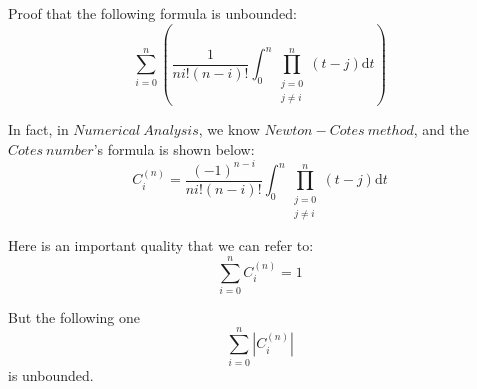 \documentclass{article}
\begin{document}
\begin{CJK*}{UTF8}{gbsn}

Proof that the following formula is unbounded:
\[ \sum\limits_{i = 0}^n \left( \frac{1}{ni!(n - i)!}\int_0^n \! \prod\limits_{\substack{j = 0 \\ j \neq i}}^n (t - j) \mathrm{d}t \right) \]

In fact, in $Numerical \ Analysis$, we know $Newton-Cotes \ method$, and the $Cotes \ number$'s formula is shown below:
\[ C_i^{(n)} = \frac{(-1)^{n - i}}{ni!(n - i)!}\int_0^n \! \prod\limits_{\substack{j = 0 \\ j \neq i}}^n (t - j) \mathrm{d}t \]

Here is an important quality that we can refer to:
\[ \sum\limits_{i = 0}^n C_i^{(n)} = 1 \]

But the following one
\[ \sum\limits_{i = 0}^n \left| C_i^{(n)} \right| \]
is unbounded.

\end{CJK*}
\end{document}
